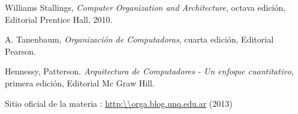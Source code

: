 \documentclass[11pt,a4paper]{book}
\begin{document}
\makeCaratulaTIP


\newpage

\tableofcontents

\newpage




\appendix




\newpage
\begin{thebibliography}{9}

 Williams Stallings, \emph{Computer Organization and Architecture}, octava edición, Editorial Prentice Hall, 2010.

 A. Tanenbaum, \emph{Organización de Computadoras}, cuarta edición, Editorial Pearson.

 Hennessy, Patterson. \emph{Arquitectura de Computadores - Un enfoque cuantitativo}, primera edición,  Editorial Mc Graw Hill.

 Sitio oficial de la materia \orga: \url{http:\\orga.blog.unq.edu.ar} (2013)

\end{thebibliography}
\end{document}
